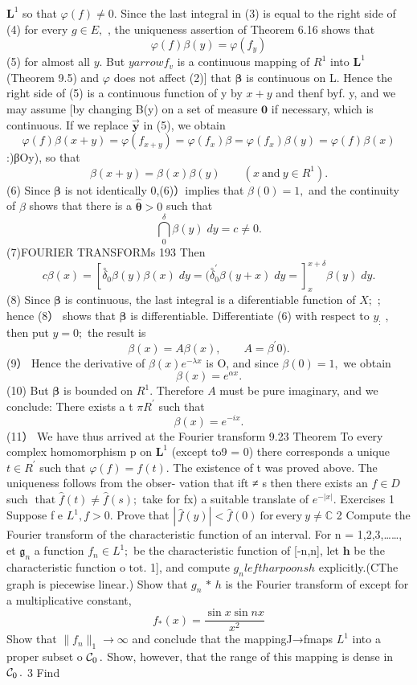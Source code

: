 ${\boldsymbol{L}}^{1}$ so that $\varphi(f)\neq0.$ Since the last integral in (3) is equal to the right side of (4) for every $\scriptstyle g\in E,$ , the uniqueness assertion of Theorem 6.16 shows that $$ \varphi(f)\beta(y)=\varphi(f_{y}) $$ (5) for almost all $y.$ But $y{ arrow}f_{v}$ is a continuous mapping of $R^{1}$ into ${\boldsymbol{L}}^{1}$ (Theorem 9.5) and $\varphi$ does not affect (2)] that $\boldsymbol{\beta}$ is continuous on L. Hence the right side of (5) is a continuous function of y by $x+y$ and thenf byf. y, and we may assume [by changing B(y) on a set of measure $\mathbf{0}$ if necessary, which is continuous. If we replace $\mathbf{\vec{y}}$ in (5), we obtain $$ \varphi(f)\beta(x+y)=\varphi(f_{x+y})=\varphi(f_{x})\beta=\varphi(f_{x})\beta(y)=\varphi(f)\beta(x) $$ :)βOy), so that $$ \beta(x+y)=\beta(x)\beta(y)\qquad(x{\mathrm{~and~}}y\in R^{1}). $$ (6) Since $\boldsymbol{\beta}$ is not identically 0,(6)）implies that $\beta(0)=1,$ and the continuity of $\beta$ shows that there is a $\scriptstyle\mathbf{\hat{\theta}}>0$ such that $$ \bigcap_{0}^{\delta}\beta(y)\;d y=c\neq0. $$ (7)FOURIER TRANSFORMs 193 Then $$ c\beta(x)=\left[\stackrel{\circ}{\delta}_{0}^{}\beta(y)\beta(x)\;d y= (\stackrel{\circ}{\delta}_{0}^{\prime}\beta(y+x)\;d y=\right]_{x}^{x+\delta}\beta(y)\;d y. $$ (8) Since $\boldsymbol{\beta}$ is continuous, the last integral is a diferentiable function of $X;$ ; hence (8） shows that $\boldsymbol{\beta}$ is differentiable. Differentiate (6) with respect to $y_{\mathrm{:}}$ , then put $y=0;$ the result is $$ \beta(x)=A\beta(x),\qquad A=\beta^{\prime}0). $$ (9） Hence the derivative of $\beta(x)e^{-\lambda x}$ is O, and since $\beta(0)=1,$ we obtain $$ \beta(x)=e^{\alpha x}. $$ (10) But $\boldsymbol{\beta}$ is bounded on $R^{1}.$ Therefore $\scriptstyle A$ must be pure imaginary, and we conclude: There exists a t $\scriptstyle{\pi R^{\prime}}$ such that $$ \beta(x)=e^{-i x}. $$ (11） We have thus arrived at the Fourier transform 9.23 Theorem To every complex homomorphism p on ${\boldsymbol{L}}^{1}$ (except to9 = 0) there corresponds a unique $\scriptstyle t\in R^{\prime}$ such that $\varphi(f)=f(t).$ The existence of t was proved above. The uniqueness follows from the obser- vation that ift ≠ s then there exists an $\scriptstyle f\in D$ such $\operatorname{that}{\hat{f}}(t)\neq{\hat{f}}(s);$ take for fx) a suitable translate of $e^{-|x|}.$ Exercises 1 Suppose f e $L^{1},f>0.$ Prove that $|\,{\hat{f}}(y)|<{\hat{f}}(0){\mathrm{~for~every~}}y\neq\mathbb{C}$ 2 Compute the Fourier transform of the characteristic function of an interval. For n = 1,2,3,……, et ${\mathfrak{g}}_{n}$ a function $f_{n}\in L^{1};$ be the characteristic function of [-n,n], let ${\boldsymbol{h}}$ be the characteristic function o $\scriptstyle{\mathrm{tot.}}$ 1], and compute ${\mathit{g_{n}}} leftharpoons h$ explicitly.(CThe graph is piecewise linear.) Show that ${\mathit{g_{n}}}\,\ast\,h$ is the Fourier transform of except for a multiplicative constant, $$ f_{*}(x)={\frac{\sin x\sin n x}{x^{2}}} $$ Show that $\|f_{n}\|_{1}\to\infty$ and conclude that the mappingJ→fmaps $L^{1}$ into a proper subset o ${\cal C}_{0}\,.$ Show, however, that the range of this mapping is dense in ${\cal C}_{0}\,.$ 3 Find $$ 